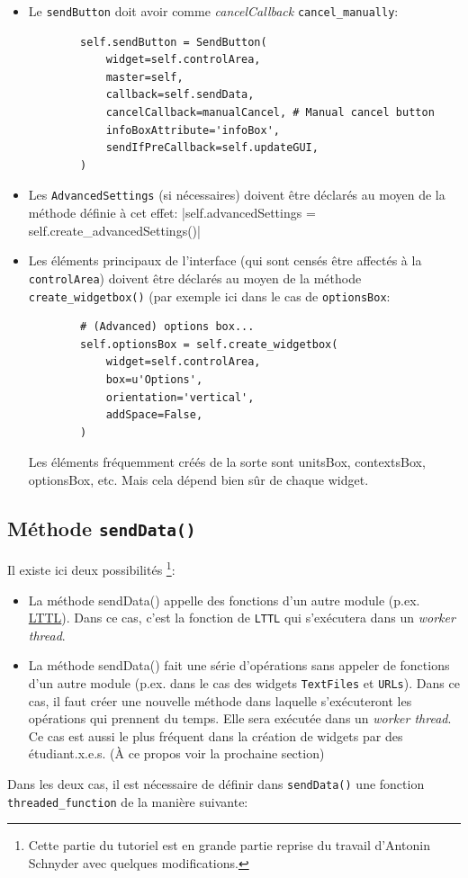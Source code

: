 \documentclass{article}
\begin{document}
\begin{itemize}
    \item Le \texttt{sendButton} doit avoir comme \textit{cancelCallback} \texttt{cancel\_manually}:
    \begin{verbatim}
        self.sendButton = SendButton(
            widget=self.controlArea,
            master=self,
            callback=self.sendData,
            cancelCallback=manualCancel, # Manual cancel button
            infoBoxAttribute='infoBox',
            sendIfPreCallback=self.updateGUI,
        )
    \end{verbatim}
    \item Les \texttt{AdvancedSettings} (si nécessaires) doivent être déclarés au moyen de la méthode définie à cet effet:
    |self.advancedSettings = self.create_advancedSettings()|
    \item Les éléments principaux de l'interface (qui sont censés être affectés à la \texttt{controlArea}) doivent être déclarés au moyen de la méthode \texttt{create\_widgetbox()} (par exemple ici dans le cas de \texttt{optionsBox}: 
    \begin{verbatim}
        # (Advanced) options box...
        self.optionsBox = self.create_widgetbox(
            widget=self.controlArea,
            box=u'Options',
            orientation='vertical',
            addSpace=False,
        )
    \end{verbatim}
    Les éléments fréquemment créés de la sorte sont unitsBox, contextsBox, optionsBox, etc. Mais cela dépend bien sûr de chaque widget.
\end{itemize}

\subsection{Méthode \texttt{sendData()}}

Il existe ici deux possibilités \footnote{Cette partie du tutoriel est en grande partie reprise du travail d'Antonin Schnyder avec quelques modifications.}:
\begin{itemize}
    \item La méthode sendData() appelle des fonctions d’un autre module (p.ex. \href{https://github.com/axanthos/LTTL}{LTTL}). Dans ce cas, c'est la fonction de \texttt{LTTL} qui s’exécutera dans un \textit{worker thread}.
    \item La méthode sendData() fait une série d’opérations sans appeler de fonctions d’un autre module (p.ex. dans le cas des widgets \texttt{TextFiles} et \texttt{URLs}). Dans ce cas, il faut créer une nouvelle méthode dans laquelle s'exécuteront les opérations qui prennent du temps. Elle sera exécutée dans un \textit{worker thread}. Ce cas est aussi le plus fréquent dans la création de widgets par des étudiant.x.e.s. (À ce propos voir la prochaine section)
\end{itemize}
\vspace{5mm}
Dans les deux cas, il est nécessaire de définir dans \texttt{sendData()} une fonction \texttt{threaded\_function} de la manière suivante: 
\end{document}
